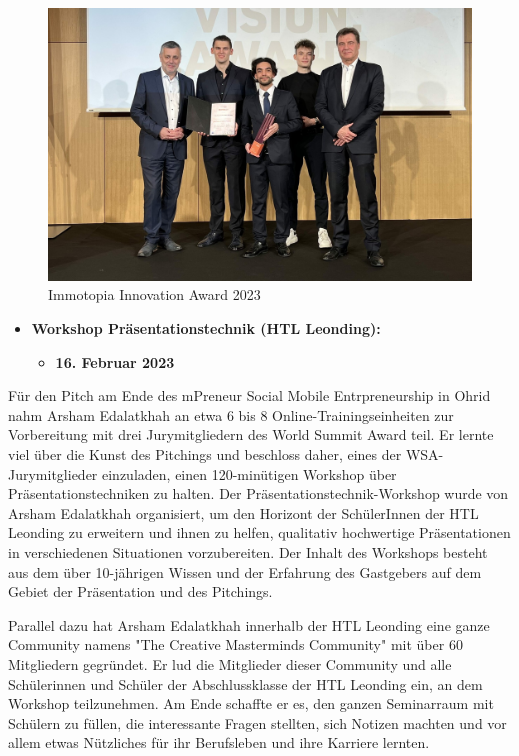 \begin{figure}[H]
    \centering
    \includegraphics[width=1\textwidth]{pics/Immotopia-2023.jpg}
    \caption{Immotopia Innovation Award 2023}
    \label{fig:Immotopia2023}
\end{figure}

\begin{itemize}
    \item \textbf{Workshop Präsentationstechnik (HTL Leonding):}
          \begin{itemize}
              \item \textbf{16. Februar 2023}
          \end{itemize}
\end{itemize}


Für den Pitch am Ende des mPreneur Social Mobile Entrpreneurship in Ohrid nahm Arsham Edalatkhah an etwa 6 bis 8 Online-Trainingseinheiten zur Vorbereitung mit drei Jurymitgliedern des World Summit Award teil. Er lernte viel über die Kunst des Pitchings und beschloss daher, eines der WSA-Jurymitglieder einzuladen, einen 120-minütigen Workshop über Präsentationstechniken zu halten. Der Präsentationstechnik-Workshop wurde von Arsham Edalatkhah organisiert, um den Horizont der SchülerInnen der HTL Leonding zu erweitern und ihnen zu helfen, qualitativ hochwertige Präsentationen in verschiedenen Situationen vorzubereiten. Der Inhalt des Workshops besteht aus dem über 10-jährigen Wissen und der Erfahrung des Gastgebers auf dem Gebiet der Präsentation und des Pitchings.

Parallel dazu hat Arsham Edalatkhah innerhalb der HTL Leonding eine ganze Community namens "The Creative Masterminds Community" mit über 60 Mitgliedern gegründet. Er lud die Mitglieder dieser Community und alle Schülerinnen und Schüler der Abschlussklasse der HTL Leonding ein, an dem Workshop teilzunehmen. Am Ende schaffte er es, den ganzen Seminarraum mit Schülern zu füllen, die interessante Fragen stellten, sich Notizen machten und vor allem etwas Nützliches für ihr Berufsleben und ihre Karriere lernten.

